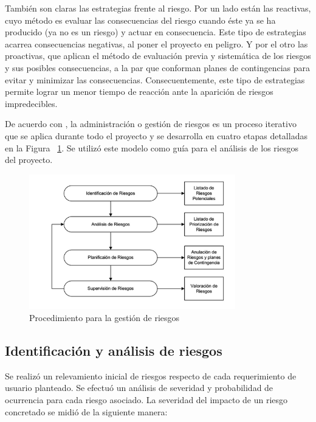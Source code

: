 		\par
     	También son claras las estrategias frente al riesgo. Por un lado están las reactivas, cuyo método es evaluar las consecuencias del riesgo cuando
 		éste ya se ha producido (ya no es un riesgo) y actuar en consecuencia. Este tipo de estrategias acarrea consecuencias negativas, al poner el
 		proyecto en peligro. Y por el otro las proactivas, que aplican el método de evaluación previa y sistemática de los riesgos y sus posibles
 		consecuencias, a la par que conforman planes de contingencias para evitar y minimizar las consecuencias. Consecuentemente, este tipo de
 		estrategias permite lograr un menor tiempo de reacción ante la aparición de riesgos impredecibles.
		\par
		De acuerdo con \cite{etiqueta_riegos3}, la administración o gestión de riesgos es un proceso iterativo que se aplica durante todo el proyecto y se
		desarrolla en cuatro etapas detalladas en la Figura ~\ref{fig:riesgos}. Se utilizó este modelo como guía para el análisis de los riesgos del
		proyecto.
		
		\begin{figure}[!h]
 		\begin{center}
  		\includegraphics[width=0.8\textwidth,keepaspectratio=true]{./images/riesgos}
  		\caption{Procedimiento para la gestión de riesgos}
  		\label{fig:riesgos}
 		\end{center}
		\end{figure}
		
		\subsection{Identificación y análisis de riesgos}
		\par
		Se realizó un relevamiento inicial de riesgos respecto de cada requerimiento de usuario planteado. Se efectuó un análisis de severidad y
		probabilidad de ocurrencia para cada riesgo asociado. La severidad del	impacto	de un riesgo concretado	se midió de la siguiente
		manera:
		
